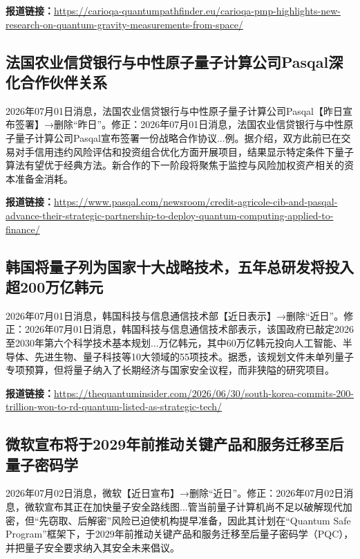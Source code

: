 \documentclass[12pt,a4paper]{ctexart}
\begin{document}
\noindent\textbf{报道链接：}\url{https://carioqa-quantumpathfinder.eu/carioqa-pmp-highlights-new-research-on-quantum-gravity-measurements-from-space/}

\subsection{ 法国农业信贷银行与中性原子量子计算公司Pasqal深化合作伙伴关系 }

2026年07月01日消息，法国农业信贷银行与中性原子量子计算公司Pasqal【昨日宣布签署】→删除“昨日”。修正：2026年07月01日消息，法国农业信贷银行与中性原子量子计算公司Pasqal宣布签署一份战略合作协议...例。据介绍，双方此前已在交易对手信用违约风险评估和投资组合优化方面开展项目，结果显示特定条件下量子算法有望优于经典方法。新合作的下一阶段将聚焦于监控与风险加权资产相关的资本准备金消耗。

\noindent\textbf{报道链接：}\url{https://www.pasqal.com/newsroom/credit-agricole-cib-and-pasqal-advance-their-strategic-partnership-to-deploy-quantum-computing-applied-to-finance/}

\subsection{ 韩国将量子列为国家十大战略技术，五年总研发将投入超200万亿韩元 }

2026年07月01日消息，韩国科技与信息通信技术部【近日表示】→删除“近日”。修正：2026年07月01日消息，韩国科技与信息通信技术部表示，该国政府已敲定2026至2030年第六个科学技术基本规划...万亿韩元，其中60万亿韩元投向人工智能、半导体、先进生物、量子科技等10大领域的55项技术。据悉，该规划文件未单列量子专项预算，但将量子纳入了长期经济与国家安全议程，而非狭隘的研究项目。

\noindent\textbf{报道链接：}\url{https://thequantuminsider.com/2026/06/30/south-korea-commits-200-trillion-won-to-rd-quantum-listed-as-strategic-tech/}

\subsection{ 微软宣布将于2029年前推动关键产品和服务迁移至后量子密码学 }

2026年07月02日消息，微软【近日宣布】→删除“近日”。修正：2026年07月02日消息，微软宣布其正在加快量子安全路线图...管当前量子计算机尚不足以破解现代加密，但“先窃取、后解密”风险已迫使机构提早准备，因此其计划在“Quantum Safe Program”框架下，于2029年前推动关键产品和服务迁移至后量子密码学（PQC），并把量子安全要求纳入其安全未来倡议。
\end{document}
